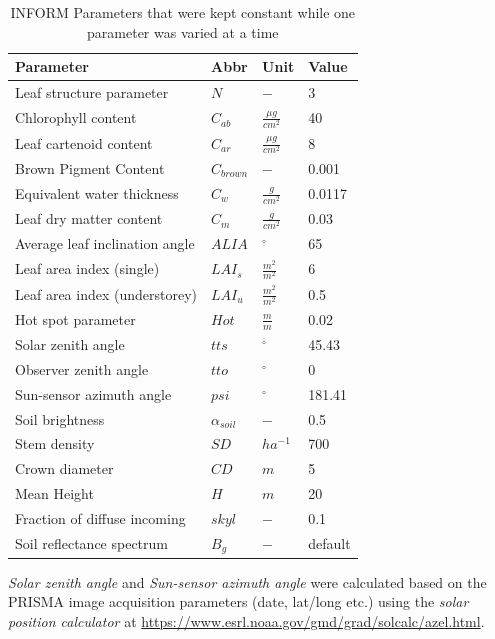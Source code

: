 \documentclass[a4paper, twoside]{templates/ociamthesis}
\begin{document}
\begin{table}[H]

\caption{\label{tab:tsfixed}INFORM Parameters that were kept constant while one parameter was varied at a time}
\centering
\begin{tabu} to 
\toprule
Parameter & Abbr & Unit & Value\\
\midrule
Leaf structure parameter & $N$ & $-$ & 3\\
Chlorophyll content & $C_{ab}$ & $\frac{\mu g}{cm^2}$ & 40\\
Leaf cartenoid content & $C_{ar}$ & $\frac{\mu g}{cm^2}$ & 8\\
Brown Pigment Content & $C_{brown}$ & $-$ & 0.001\\
Equivalent water thickness & $C_{w}$ & $\frac{g}{cm^2}$ & 0.0117\\
\addlinespace
Leaf dry matter content & $C_{m}$ & $\frac{g}{cm^2}$ & 0.03\\
Average leaf inclination angle & $ALIA$ & $^{\circ}$ & 65\\
Leaf area index (single) & $LAI_{s}$ & $\frac{m^2}{m^2}$ & 6\\
Leaf area index (understorey) & $LAI_{u}$ & $\frac{m^2}{m^2}$ & 0.5\\
Hot spot parameter & $Hot$ & $\frac{m}{m}$ & 0.02\\
\addlinespace
Solar zenith angle & $tts$ & $^{\circ}$ & 45.43\\
Observer zenith angle & $tto$ & $^{\circ}$ & 0\\
Sun-sensor azimuth angle & $psi$ & $^{\circ}$ & 181.41\\
Soil brightness & $\alpha_{soil}$ & $-$ & 0.5\\
Stem density & $SD$ & $ha^{-1}$ & 700\\
\addlinespace
Crown diameter & $CD$ & $m$ & 5\\
Mean Height & $H$ & $m$ & 20\\
Fraction of diffuse incoming & $skyl$ & $-$ & 0.1\\
Soil reflectance spectrum & $B_{g}$ & $-$ & default\\
\bottomrule
\end{tabu}
\end{table}

\emph{Solar zenith angle} and \emph{Sun-sensor azimuth angle} were calculated based on the PRISMA image acquisition parameters (date, lat/long etc.) using the \emph{solar position calculator} at \url{https://www.esrl.noaa.gov/gmd/grad/solcalc/azel.html}.
\end{document}

